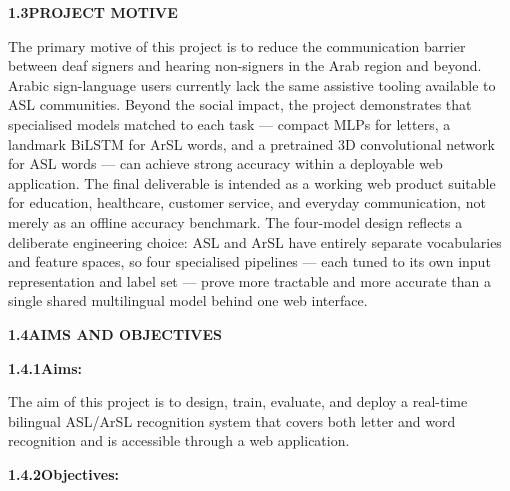 \noindent\textbf{1.3\quad PROJECT MOTIVE}\par
{}
\vspace{0.4cm}

\noindent The primary motive of this project is to reduce the communication barrier between deaf signers and hearing non-signers in the Arab region and beyond. Arabic sign-language users currently lack the same assistive tooling available to ASL communities. Beyond the social impact, the project demonstrates that specialised models matched to each task --- compact MLPs for letters, a landmark BiLSTM for ArSL words, and a pretrained 3D convolutional network for ASL words --- can achieve strong accuracy within a deployable web application. The final deliverable is intended as a working web product suitable for education, healthcare, customer service, and everyday communication, not merely as an offline accuracy benchmark. The four-model design reflects a deliberate engineering choice: ASL and ArSL have entirely separate vocabularies and feature spaces, so four specialised pipelines --- each tuned to its own input representation and label set --- prove more tractable and more accurate than a single shared multilingual model behind one web interface.\par\vspace{0.6cm}

\noindent\textbf{1.4\quad AIMS AND OBJECTIVES}\par
{}
\vspace{0.4cm}

\noindent\textbf{1.4.1\quad Aims:}\par
{}
\vspace{0.3cm}

\noindent The aim of this project is to design, train, evaluate, and deploy a real-time bilingual ASL/ArSL recognition system that covers both letter and word recognition and is accessible through a web application.\par\vspace{0.4cm}

\noindent\textbf{1.4.2\quad Objectives:}\par
{}
\vspace{0.3cm}

